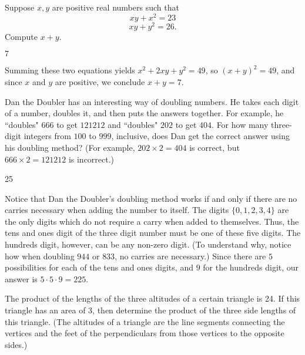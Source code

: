 \documentclass[11pt]{article}
\begin{document}
\begin{problem}
Suppose $x,y$ are positive real numbers such that \[ xy + x^2 = 23 \]  \[ xy + y^2 = 26.\] Compute $x+y$.
\end{problem}

\begin{answer}
$7$
\end{answer}

\begin{solution}
Summing these two equations yields $x^2 + 2xy + y^2 = 49$, so $(x+y)^2 = 49$, and since $x$ and $y$ are positive, we conclude $x+y = \boxed{7}$.
\end{solution}


\begin{problem}
Dan the Doubler has an interesting way of doubling numbers. He takes each digit of a number, doubles it, and then puts the answers together. 
For example, he ``doubles" $666$ to get $121212$ and ``doubles" $202$ to get $404$. For how many three-digit integers from $100$ to $999$,
inclusive, does Dan get the correct answer using his doubling method? (For example, $202 \times 2 = 404$ is correct, but $666 \times 2 = 121212$ is incorrect.)
\end{problem}

\begin{answer}
25
\end{answer}

\begin{solution}
Notice that Dan the Doubler's doubling method works if and only if there are no carries necessary when adding the number to itself. The digits $\{0, 1, 2, 3, 4\}$ are the only digits which do not require a carry when added to themselves. Thus, the tens and ones digit of the three digit number must be one of these five digits. The hundreds digit, however, can be any non-zero digit. (To understand why, notice how when doubling $944$ or $833$, no carries are necessary.) Since there are $5$ possibilities for each of the tens and ones digits, and $9$ for the hundreds digit, our answer is $5 \cdot 5 \cdot 9 = \boxed{225}$.
\end{solution}


\begin{problem}
The product of the lengths of the three altitudes of a certain triangle is 24. If this triangle has an area of 3, then determine the product of the three side lengths of this triangle.  (The altitudes of a triangle are the line segments connecting the vertices and the feet of the perpendiculars from those vertices to the opposite sides.) %
\end{problem}
\end{document}
